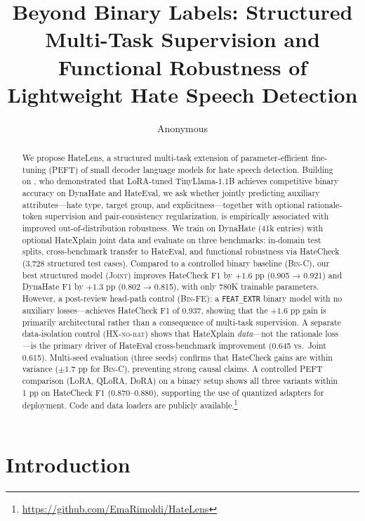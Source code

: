 \documentclass{article}
\title{Beyond Binary Labels: Structured Multi-Task Supervision and\\
Functional Robustness of Lightweight Hate Speech Detection}
\author{%
  Anonymous
}
\newcommand{\method}{HateLens}
\begin{document}
\maketitle

\begin{abstract}
We propose \method{}, a structured multi-task extension of parameter-efficient
fine-tuning (PEFT) of small decoder language models for hate speech detection.
Building on \citet{sen2024hatetinyllm}, who demonstrated that LoRA-tuned
TinyLlama-1.1B achieves competitive binary accuracy on DynaHate and HateEval,
we ask whether jointly predicting auxiliary attributes—hate type, target group,
and explicitness—together with optional rationale-token supervision and
pair-consistency regularization, is empirically associated with improved
out-of-distribution robustness.
We train on DynaHate (41k entries) with optional HateXplain joint data and
evaluate on three benchmarks: in-domain test splits, cross-benchmark transfer
to HateEval, and functional robustness via HateCheck (3,728 structured test cases).
Compared to a controlled binary baseline (\textsc{Bin-C}), our best structured
model (\textsc{Joint}) improves HateCheck F1 by $+1.6$ pp (0.905 → 0.921) and
DynaHate F1 by $+1.3$ pp (0.802 → 0.815), with only 780K trainable parameters.
However, a post-review head-path control (\textsc{Bin-FE}): a
\texttt{FEAT\_EXTR} binary model with no auxiliary losses—achieves HateCheck F1
of 0.937, showing that the $+1.6$ pp gain is primarily architectural rather than
a consequence of multi-task supervision.
A separate data-isolation control (\textsc{HX-no-rat}) shows that HateXplain
\emph{data}—not the rationale loss—is the primary driver of HateEval
cross-benchmark improvement (0.645 vs.\ Joint 0.615).
Multi-seed evaluation (three seeds) confirms that HateCheck gains are within
variance ($\pm 1.7$ pp for \textsc{Bin-C}), preventing strong causal claims.
A controlled PEFT comparison (LoRA, QLoRA, DoRA) on a binary setup shows all
three variants within 1 pp on HateCheck F1 (0.870–0.880), supporting the use of
quantized adapters for deployment.
Code and data loaders are publicly available.\footnote{\url{https://github.com/EmaRimoldi/HateLens}}
\end{abstract}

\section{Introduction}
\label{sec:intro}
\end{document}
